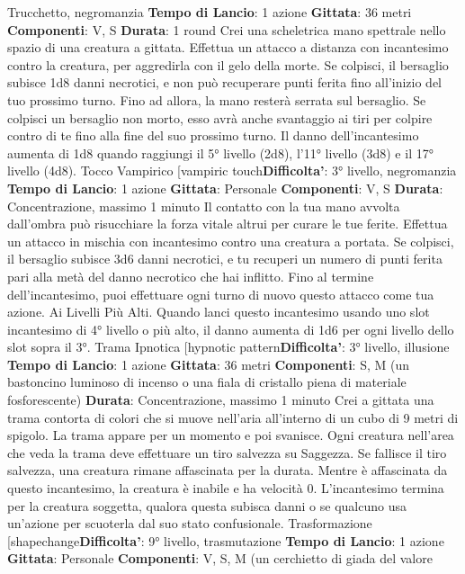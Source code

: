 \begin{multicols}{2}
Trucchetto, negromanzia
\textbf{Tempo di Lancio}: 1 azione
\textbf{Gittata}: 36 metri
\textbf{Componenti}: V, S
\textbf{Durata}: 1 round
Crei una scheletrica mano spettrale nello spazio di una
creatura a gittata. Effettua un attacco a distanza con
incantesimo contro la creatura, per aggredirla con il
gelo della morte. Se colpisci, il bersaglio subisce 1d8
danni necrotici, e non può recuperare punti ferita fino
all’inizio del tuo prossimo turno. Fino ad allora, la mano
resterà serrata sul bersaglio.
Se colpisci un bersaglio non morto, esso avrà anche
svantaggio ai tiri per colpire contro di te fino alla fine del
suo prossimo turno.
Il danno dell’incantesimo aumenta di 1d8 quando
raggiungi il 5° livello (2d8), l’11° livello (3d8) e il 17°
livello (4d8).
Tocco Vampirico
[vampiric touch\textbf{Difficolta'}:
3° livello, negromanzia
\textbf{Tempo di Lancio}: 1 azione
\textbf{Gittata}: Personale
\textbf{Componenti}: V, S
\textbf{Durata}: Concentrazione, massimo 1 minuto
Il contatto con la tua mano avvolta dall’ombra può
risucchiare la forza vitale altrui per curare le tue ferite.
Effettua un attacco in mischia con incantesimo contro
una creatura a portata. Se colpisci, il bersaglio subisce
3d6 danni necrotici, e tu recuperi un numero di punti
ferita pari alla metà del danno necrotico che hai inflitto.
Fino al termine dell’incantesimo, puoi effettuare ogni
turno di nuovo questo attacco come tua azione.
Ai Livelli Più Alti. Quando lanci questo incantesimo
usando uno slot incantesimo di 4° livello o più alto, il
danno aumenta di 1d6 per ogni livello dello slot sopra il
3°.
Trama Ipnotica
[hypnotic pattern\textbf{Difficolta'}:
3° livello, illusione
\textbf{Tempo di Lancio}: 1 azione
\textbf{Gittata}: 36 metri
\textbf{Componenti}: S, M (un bastoncino luminoso di incenso
o una fiala di cristallo piena di materiale fosforescente)
\textbf{Durata}: Concentrazione, massimo 1 minuto
Crei a gittata una trama contorta di colori che si muove
nell’aria all’interno di un cubo di 9 metri di spigolo. La
trama appare per un momento e poi svanisce. Ogni
creatura nell’area che veda la trama deve effettuare un
tiro salvezza su Saggezza. Se fallisce il tiro salvezza,
una creatura rimane affascinata per la durata. Mentre è
affascinata da questo incantesimo, la creatura è inabile
e ha velocità 0.
L’incantesimo termina per la creatura soggetta, qualora
questa subisca danni o se qualcuno usa un’azione per
scuoterla dal suo stato confusionale.
Trasformazione
[shapechange\textbf{Difficolta'}:
9° livello, trasmutazione
\textbf{Tempo di Lancio}: 1 azione
\textbf{Gittata}: Personale
\textbf{Componenti}: V, S, M (un cerchietto di giada del valore

\end{multicols}
